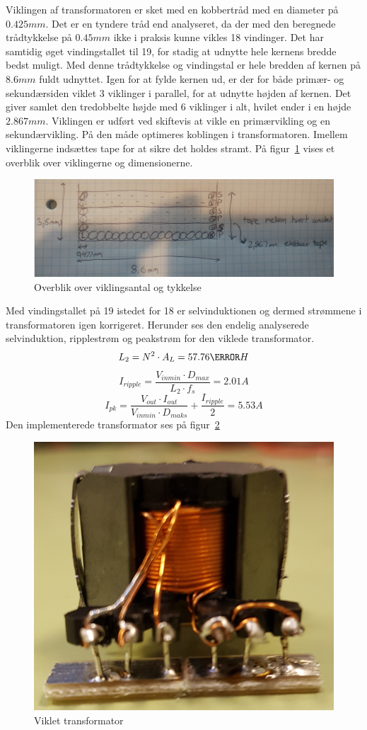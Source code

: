 Viklingen af transformatoren er sket med en kobbertråd med en diameter på $0.425mm$. Det er en tyndere tråd end analyseret, da der med den beregnede trådtykkelse på $0.45mm$ ikke i praksis kunne vikles 18 vindinger. Det har samtidig øget vindingstallet til 19, for stadig at udnytte hele kernens bredde bedst muligt. Med denne trådtykkelse og vindingstal er hele bredden af kernen på $8.6mm$ fuldt udnyttet. Igen for at fylde kernen ud, er der for både primær- og sekundærsiden viklet 3 viklinger i parallel, for at udnytte højden af kernen. Det giver samlet den tredobbelte højde med 6 viklinger i alt, hvilet ender i en højde $2.867mm$. Viklingen er udført ved skiftevis at vikle en primærvikling og en sekundærvikling. På den måde optimeres koblingen i transformatoren. Imellem viklingerne indsættes tape for at sikre det holdes stramt. På figur~\ref{fig: viklingsoverblik} vises et overblik over viklingerne og dimensionerne. 
\begin{figure}[H]
	\center
	\includegraphics[max width=0.7\linewidth]{../dokumentation/tex/2iteration/billeder/viklingsoverblik.png}
	\caption{Overblik over viklingsantal og tykkelse}
	\label{fig: viklingsoverblik}
\end{figure}
\noindent Med vindingstallet på 19 istedet for 18 er selvinduktionen og dermed strømmene i transformatoren igen korrigeret. Herunder ses den endelig analyserede selvinduktion, ripplestrøm og peakstrøm for den viklede transformator.
\begin{equation} \label{L_2}
L_2 = N^2 \cdot A_L = 57.76\micro H
\end{equation}
\begin{equation} \label{I_ripple_final}
I_{ripple} = \frac{V_{inmin} \cdot D_{max}}{L_2 \cdot f_s} = 2.01A
\end{equation}
\begin{equation} \label{I_pk_final}
I_{pk} = \frac{V_{out} \cdot I_{out}}{V_{inmin} \cdot D_{maks}} + \frac{I_{ripple}}{2} = 5.53A
\end{equation}
Den implementerede transformator ses på figur~\ref{fig: Viklettrans}
\begin{figure}[H]
	\center
	\includegraphics[max width=0.5\linewidth]{../dokumentation/tex/2iteration/billeder/Viklet_transformator.PNG}
	\caption{Viklet transformator}
	\label{fig: Viklettrans}
\end{figure}
